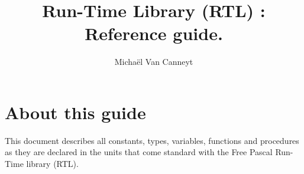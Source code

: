 %
%
%
%
%

\begin{latexonly}
  \ifpdf
  \fi
\end{latexonly}
%
%
\makeindex
\usepackage{tabularx}
%
%

\title{Run-Time Library (RTL) : \\ Reference guide.}
\label{rtl}

\author{Micha\"el Van Canneyt}
\maketitle
%
%
\makeatletter
\renewcommand*\l@section{\@dottedtocline{1}{1.5em}{2.7em}}
\renewcommand*\l@subsection{\@dottedtocline{2}{4.2em}{4em}}
\renewcommand*\l@subsubsection{\@dottedtocline{3}{8.2em}{5em}}
\makeatother
\tableofcontents
\newpage

\section*{About this guide}
This document describes all constants, types, variables, functions and
procedures as they are declared in the units that come standard with the 
Free Pascal Run-Time library (RTL).

